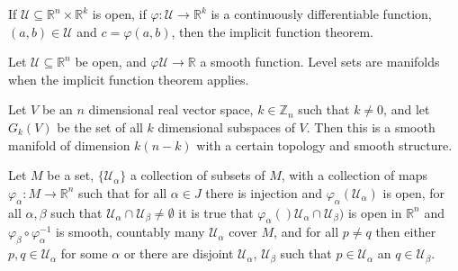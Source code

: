        \begin{theorem}
            If $\mathcal{U}\subseteq\mathbb{R}^{n}\times\mathbb{R}^{k}$ is open,
            if $\varphi:\mathcal{U}\rightarrow\mathbb{R}^{k}$ is a continuously
            differentiable function, $(a,b)\in\mathcal{U}$ and
            $c=\varphi(a,b)$, then the implicit function theorem.
        \end{theorem}
        \begin{example}
            Let $\mathcal{U}\subseteq\mathbb{R}^{n}$ be open, and
            $\varphi\mathcal{U}\rightarrow\mathbb{R}$ a smooth function.
            Level sets are manifolds when the implicit function theorem applies.
        \end{example}
        \begin{example}
            Let $V$ be an $n$ dimensional real vector space,
            $k\in\mathbb{Z}_{n}$ such that $k\ne{0}$, and let $G_{k}(V)$ be the
            set of all $k$ dimensional subspaces of $V$. Then this is a smooth
            manifold of dimension $k(n-k)$ with a certain topology and smooth
            structure.
        \end{example}
        \begin{theorem}
            Let $M$ be a set, $\{\mathcal{U}_{\alpha}\}$ a collection of subsets
            of $M$, with a collection of maps
            $\varphi_{\alpha}:M\rightarrow\mathbb{R}^{n}$ such that for all
            $\alpha\in{J}$ there is injection and
            $\varphi_{\alpha}(\mathcal{U}_{\alpha})$ is open, for all
            $\alpha,\beta$ such that
            $\mathcal{U}_{\alpha}\cap\mathcal{U}_{\beta}\ne\emptyset$ it is true
            that
            $\varphi_{\alpha}()\mathcal{U}_{\alpha}\cap\mathcal{U}_{\beta})$ is
            open in $\mathbb{R}^{n}$ and
            $\varphi_{\beta}\circ\varphi_{\alpha}^{\minus{1}}$ is smooth,
            countably many $\mathcal{U}_{\alpha}$ cover $M$, and for all
            $p\ne{q}$ then either $p,q\in\mathcal{U}_{\alpha}$ for some $\alpha$
            or there are disjoint $\mathcal{U}_{\alpha}$, $\mathcal{U}_{\beta}$
            such that $p\in\mathcal{U}_{\alpha}$ an
            $q\in\mathcal{U}_{\beta}$.
        \end{theorem}

